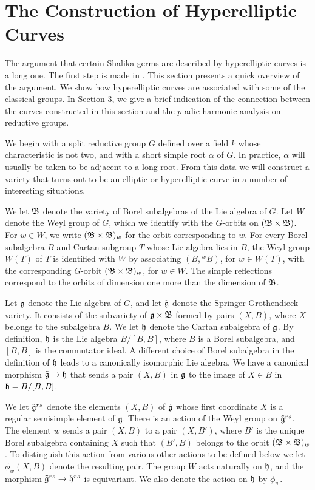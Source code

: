\documentclass{amsart}
\begin{document}
\section{The Construction of Hyperelliptic Curves} %

The argument that certain Shalika germs are described
by hyperelliptic curves
is a long one.  The first step is made in \cite{H3}.  This
section presents a quick overview of the argument.  We show how
hyperelliptic curves are associated with some of the
classical groups.  In Section 3, we 
give a brief indication of the
connection between the curves constructed in this section and
the $p$-adic harmonic analysis on reductive groups.

We begin with a split reductive group $G$ defined over a
field $k$ whose characteristic is not two, and 
with a short simple root $\alpha$ of $G$.
In practice, $\alpha$ will usually be taken to be adjacent to a long root.
From this data we will construct a variety that turns
out to be an elliptic
or  hyperelliptic curve in a number of interesting situations.

We let ${\frak B}$ denote the variety of Borel subalgebras of the
Lie algebra of $G$.  Let $W$ denote
the Weyl group of $G$, which we identify with the $G$-orbits on
$({\frak B}\times {\frak B})$.   For $w\in W$, we write $({\frak B}\times {\frak B})_w$ for the
orbit corresponding to $w$.  
For every Borel subalgebra $B$ and Cartan subgroup $T$ whose Lie algebra
lies in $B$,
the Weyl group $W(T)$ of $T$ is identified with $W$ by
associating $(B,{}^w\! B)$, for $w\in W(T)$, with the 
corresponding $G$-orbit $({\frak B}\times{\frak B})_w$, for $w\in W$.
   The simple reflections correspond to the
orbits of dimension one more than the dimension of ${\frak B}$.

Let ${\frak g}$ denote the Lie algebra of $G$, and let $\tilde{{\frak g}}$ denote
the Springer-Grothendieck variety.  It consists of the subvariety
of ${\frak g}\times {\frak B}$ formed by pairs $(X,B)$, where $X$ belongs to the
subalgebra $B$.  We let ${\frak h}$ denote the Cartan subalgebra of ${\frak g}$.
By definition, ${\frak h}$ is the Lie algebra $B/[B,B]$, where $B$ is a Borel
subalgebra, and $[B,B]$ is the commutator ideal.  
A different choice of Borel subalgebra in the definition of ${\frak h}$ leads
to a canonically isomorphic Lie algebra. 
We have a canonical morphism $\tilde {{\frak g}}\to {\frak h}$ that sends a pair $(X,B)$ in ${\frak g}$
to the image of $X\in B$ in ${\frak h}=B/[B,B]$.

We let $\tilde{{\frak g}}^{rs}$ denote the elements $(X,B)$ of $\tilde{{\frak g}}$ whose
first coordinate $X$ is a regular semisimple element of ${\frak g}$.
There is an action of the Weyl group on $\tilde{{\frak g}}^{rs}$.  The element
$w$ sends a pair $(X,B)$ to a pair $(X,B')$, where $B'$ is the unique
Borel subalgebra containing $X$ such that $(B',B)$ belongs to the
orbit $({\frak B}\times{\frak B})_w$.  To distinguish
this action from various other actions to be defined below we let
$\phi_w(X,B)$ denote the resulting pair.  The group $W$ acts naturally
on ${\frak h}$, and the morphism $\tilde{{\frak g}}^{rs}\to{\frak h}^{rs}$ is equivariant.  
We also
denote the action on ${\frak h}$ by $\phi_w$.
\end{document}
